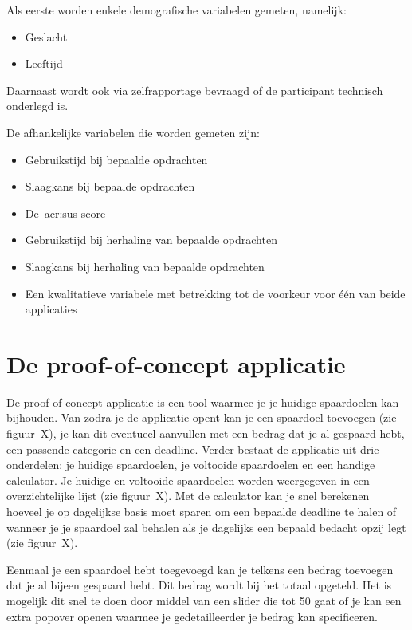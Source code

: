 Als eerste worden enkele demografische variabelen gemeten, namelijk:
\begin{itemize}
    \item Geslacht
    \item Leeftijd
\end{itemize}
Daarnaast wordt ook via zelfrapportage bevraagd of de participant technisch onderlegd is.

De afhankelijke variabelen die worden gemeten zijn:
\begin{itemize}
    \item Gebruikstijd bij bepaalde opdrachten
    \item Slaagkans bij bepaalde opdrachten
    \item De~\acrshort{acr:sus}-score
    \item Gebruikstijd bij herhaling van bepaalde opdrachten
    \item Slaagkans bij herhaling van bepaalde opdrachten
    \item Een kwalitatieve variabele met betrekking tot de voorkeur voor één van beide applicaties
\end{itemize}

\section{De proof-of-concept applicatie}
\label{sec:applicatie}

De proof-of-concept applicatie is een tool waarmee je je huidige spaardoelen kan bijhouden. Van zodra je de applicatie opent kan je een spaardoel toevoegen (zie figuur~X), je kan dit eventueel aanvullen met een bedrag dat je al gespaard hebt, een passende categorie en een deadline. Verder bestaat de applicatie uit drie onderdelen; je huidige spaardoelen, je voltooide spaardoelen en een handige calculator. Je huidige en voltooide spaardoelen worden weergegeven in een overzichtelijke lijst (zie figuur~X). Met de calculator kan je snel berekenen hoeveel je op dagelijkse basis moet sparen om een bepaalde deadline te halen of wanneer je je spaardoel zal behalen als je dagelijks een bepaald bedacht opzij legt (zie figuur~X).




Eenmaal je een spaardoel hebt toegevoegd kan je telkens een bedrag toevoegen dat je al bijeen gespaard hebt. Dit bedrag wordt bij het totaal opgeteld. Het is mogelijk dit snel te doen door middel van een slider die tot 50 gaat of je kan een extra popover openen waarmee je gedetailleerder je bedrag kan specificeren.

